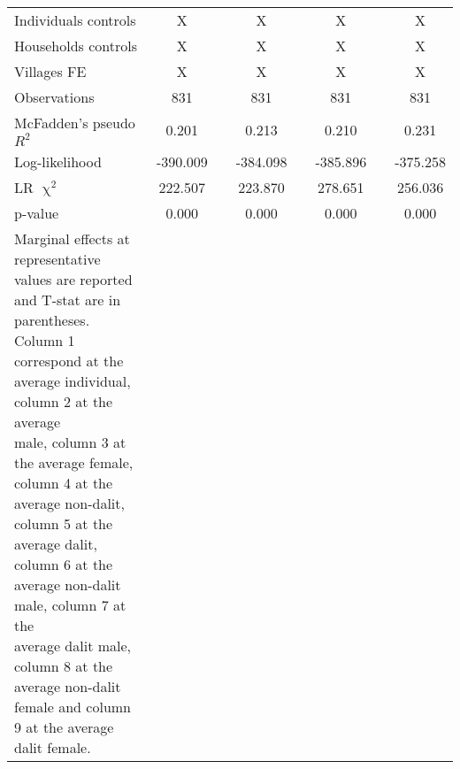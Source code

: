 \begin{table}[!h]
{\begin{tabular}{lcccccccccccc}
\cmidrule{1-2}\cmidrule{4-5}\cmidrule{7-8}\cmidrule{10-13}  
    Individuals controls & X     &       & \multicolumn{2}{c}{X} &       & \multicolumn{2}{c}{X} &       & \multicolumn{4}{c}{X} \\
    Households controls & X     &       & \multicolumn{2}{c}{X} &       & \multicolumn{2}{c}{X} &       & \multicolumn{4}{c}{X} \\
    Villages FE & X     &       & \multicolumn{2}{c}{X} &       & \multicolumn{2}{c}{X} &       & \multicolumn{4}{c}{X} \\
    \midrule
    Observations & 831   &       & \multicolumn{2}{c}{831} &       & \multicolumn{2}{c}{831} &       & \multicolumn{4}{c}{831} \\
    McFadden's pseudo $R^2$ & 0.201 &       & \multicolumn{2}{c}{0.213} &       & \multicolumn{2}{c}{0.210} &       & \multicolumn{4}{c}{0.231} \\
    Log-likelihood & -390.009 &       & \multicolumn{2}{c}{-384.098} &       & \multicolumn{2}{c}{-385.896} &       & \multicolumn{4}{c}{-375.258} \\
    LR $\upchi^2$ & 222.507 &       & \multicolumn{2}{c}{223.870} &       & \multicolumn{2}{c}{278.651} &       & \multicolumn{4}{c}{256.036} \\
    p-value & 0.000 &       & \multicolumn{2}{c}{0.000} &       & \multicolumn{2}{c}{0.000} &       & \multicolumn{4}{c}{0.000} \\
    \bottomrule
	\Tablenote{13}{
	Marginal effects at representative values are reported and T-stat are in parentheses. Column 1 correspond at the average individual, column 2 at the average \\ 
	male, column 3 at the average female, column 4 at the average non-dalit, column 5 at the average dalit, column 6 at the average non-dalit male, column 7 at the \\ 
	average dalit male, column 8 at the average non-dalit female and column 9 at the average dalit female.} \\
    \end{tabular}%
	}
  \label{tab:ame_indebt}%
\end{table}%